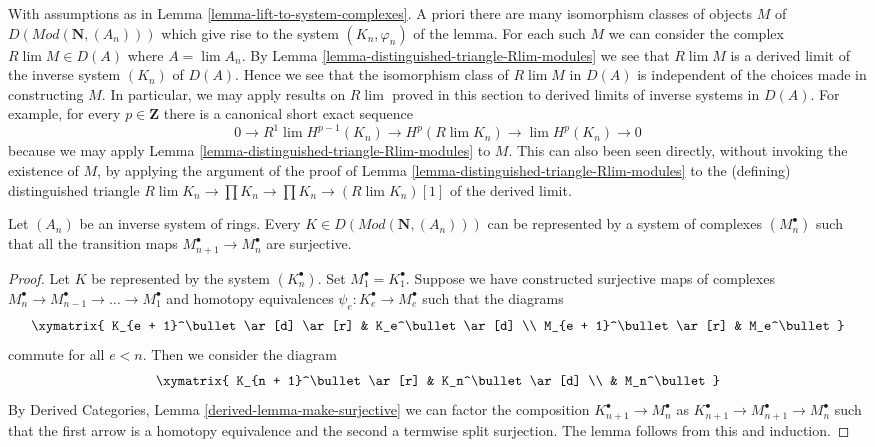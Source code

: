 \begin{remark}
\label{remark-how-unique}
With assumptions as in Lemma \ref{lemma-lift-to-system-complexes}.
A priori there are many isomorphism classes of objects $M$ of
$D(\textit{Mod}(\mathbf{N}, (A_n)))$ which give rise to the system
$(K_n, \varphi_n)$ of the lemma. For each such $M$ we can consider the
complex $R\lim M \in D(A)$ where $A = \lim A_n$. By
Lemma \ref{lemma-distinguished-triangle-Rlim-modules}
we see that $R\lim M$ is a derived limit of the inverse system
$(K_n)$ of $D(A)$. Hence we see that the isomorphism class of $R\lim M$ in
$D(A)$ is independent of the choices made in constructing $M$.
In particular, we may apply results on $R\lim$ proved in this section to
derived limits of inverse systems in $D(A)$.
For example, for every $p \in \mathbf{Z}$ there is a
canonical short exact sequence
$$
0 \to R^1\lim H^{p - 1}(K_n) \to H^p(R\lim K_n) \to \lim H^p(K_n) \to 0
$$
because we may apply Lemma \ref{lemma-distinguished-triangle-Rlim-modules}
to $M$. This can also been seen directly, without invoking the existence of $M$,
by applying the argument of the proof of
Lemma \ref{lemma-distinguished-triangle-Rlim-modules} to the (defining)
distinguished triangle
$R\lim K_n \to \prod K_n \to \prod K_n \to (R\lim K_n)[1]$
of the derived limit.
\end{remark}

\begin{lemma}
\label{lemma-get-ML-system}
Let $(A_n)$ be an inverse system of rings. Every
$K \in D(\textit{Mod}(\mathbf{N}, (A_n)))$
can be represented by a system of complexes $(M_n^\bullet)$
such that all the transition maps $M_{n + 1}^\bullet \to M_n^\bullet$
are surjective.
\end{lemma}

\begin{proof}
Let $K$ be represented by the system $(K_n^\bullet)$. Set
$M_1^\bullet = K_1^\bullet$. Suppose we have constructed surjective maps
of complexes $M_n^\bullet \to M_{n - 1}^\bullet \to \ldots \to M_1^\bullet$
and homotopy equivalences $\psi_e : K_e^\bullet \to M_e^\bullet$ such that
the diagrams
$$
\xymatrix{
K_{e + 1}^\bullet \ar[d] \ar[r] & K_e^\bullet \ar[d] \\
M_{e + 1}^\bullet \ar[r] & M_e^\bullet
}
$$
commute for all $e < n$. Then we consider the diagram
$$
\xymatrix{
K_{n + 1}^\bullet \ar[r] & K_n^\bullet \ar[d] \\
& M_n^\bullet
}
$$
By Derived Categories, Lemma \ref{derived-lemma-make-surjective}
we can factor the composition $K_{n + 1}^\bullet \to M_n^\bullet$ as
$K_{n + 1}^\bullet \to M_{n + 1}^\bullet \to M_n^\bullet$
such that the first arrow is a homotopy equivalence and the
second a termwise split surjection. The lemma follows
from this and induction.
\end{proof}


